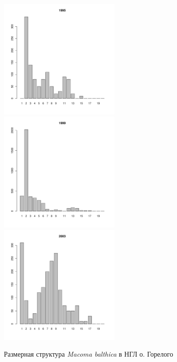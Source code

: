 \begin{figure}[h]
\begin{multicols}{3}
\hfill
\includegraphics[width=60mm]{../White_Sea/Luvenga_Goreliy/low_1995_.pdf}
\hfill
\includegraphics[width=60mm]{../White_Sea/Luvenga_Goreliy/low_1999_.pdf}
\hfill
\includegraphics[width=60mm]{../White_Sea/Luvenga_Goreliy/low_2003_.pdf}
\end{multicols}


\caption{Размерная структура {\it Macoma balthica} в НГЛ о. Горелого}
\label{ris:size_str_Goreliy_low}
\end{figure}


